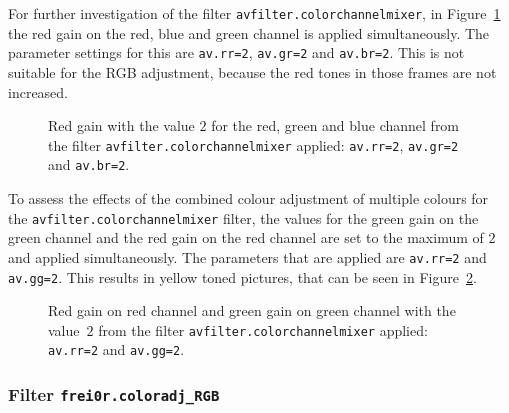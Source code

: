 \documentclass[../MasterThesis.tex]{subfiles}
\begin{document}
For further investigation of the filter \texttt{avfilter.colorchannelmixer}, in Figure~\ref{figure:rrbrgr} the red gain on the red, blue and green channel is applied simultaneously. The parameter settings for this are \texttt{av.rr=2}, \texttt{av.gr=2} and \texttt{av.br=2}. This is not suitable for the RGB adjustment, because the red tones in those frames are not increased.


\begin{figure}[H]
	\begin{center}
		\caption[Red gain set to $2$ with \texttt{avfilter.colorchannelmixer}.]{Red gain with the value $2$ for the red, green and blue channel from the filter \texttt{avfilter.colorchannelmixer} applied: \texttt{av.rr=2}, \texttt{av.gr=2} and \texttt{av.br=2}.}
		\label{figure:rrbrgr}
	\end{center}
\end{figure}

To assess the effects of the combined colour adjustment of multiple colours for the \texttt{avfilter.colorchannelmixer} filter, the values for the green gain on the green channel and the red gain on the red channel are set to the maximum of $2$ and applied simultaneously. 
The parameters that are applied are \texttt{av.rr=2} and \texttt{av.gg=2}.
This results in yellow toned pictures, that can be seen in Figure~\ref{figure:rrgg}.


\begin{figure}[H]
	\begin{center}
		\caption[Red and green gain set to $2$ with \texttt{avfilter.colorchannelmixer}.]{Red gain on red channel and green gain on green channel with the value~$2$ from the filter \texttt{avfilter.colorchannelmixer} applied: \texttt{av.rr=2} and \texttt{av.gg=2}.}
		\label{figure:rrgg}
	\end{center}
\end{figure}







\subsubsection*{Filter \texttt{frei0r.coloradj\_RGB}}
\end{document}
